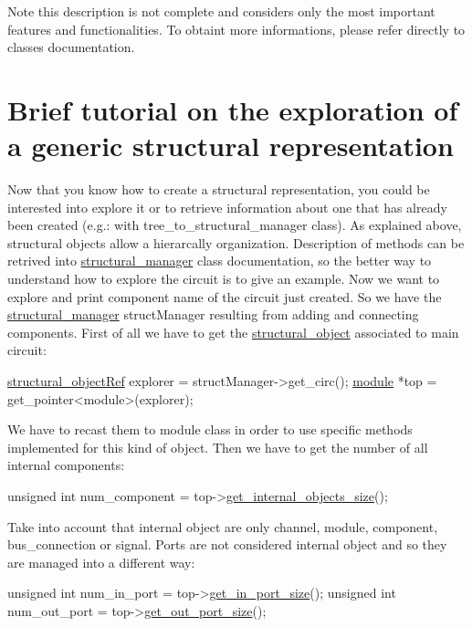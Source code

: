 \begin{DoxyNote}{Note}
this description is not complete and considers only the most important features and functionalities. To obtaint more informations, please refer directly to classes documentation.
\end{DoxyNote}
\hypertarget{src_circuit_page_circuit_exploration_how_to}{}\section{Brief tutorial on the exploration of a generic structural representation}\label{src_circuit_page_circuit_exploration_how_to}
Now that you know how to create a structural representation, you could be interested into explore it or to retrieve information about one that has already been created (e.\+g.\+: with tree\+\_\+to\+\_\+structural\+\_\+manager class). As explained above, structural objects allow a hierarcally organization. Description of methods can be retrived into \hyperlink{classstructural__manager}{structural\+\_\+manager} class documentation, so the better way to understand how to explore the circuit is to give an example. Now we want to explore and print component name of the circuit just created. So we have the \hyperlink{classstructural__manager}{structural\+\_\+manager} struct\+Manager resulting from adding and connecting components. First of all we have to get the \hyperlink{classstructural__object}{structural\+\_\+object} associated to main circuit\+: 
\begin{DoxyCode}
\hyperlink{structrefcount}{structural\_objectRef} explorer = structManager->get\_circ();
\hyperlink{classmodule}{module} *top = get\_pointer<module>(explorer);
\end{DoxyCode}
 We have to recast them to module class in order to use specific methods implemented for this kind of object. Then we have to get the number of all internal components\+: 
\begin{DoxyCode}
\textcolor{keywordtype}{unsigned} \textcolor{keywordtype}{int} num\_component = top->\hyperlink{classmodule_a4ddb109ccb130b31471a7648dbcf5352}{get\_internal\_objects\_size}();
\end{DoxyCode}
 Take into account that internal object are only channel, module, component, bus\+\_\+connection or signal. Ports are not considered internal object and so they are managed into a different way\+: 
\begin{DoxyCode}
\textcolor{keywordtype}{unsigned} \textcolor{keywordtype}{int} num\_in\_port = top->\hyperlink{classmodule_aea3a2e04dfd2a7bd0c9e978d9d1b2454}{get\_in\_port\_size}();
\textcolor{keywordtype}{unsigned} \textcolor{keywordtype}{int} num\_out\_port = top->\hyperlink{classmodule_af2b9fb284dad89d2d0a6d43d257ebd9e}{get\_out\_port\_size}();
\end{DoxyCode}
